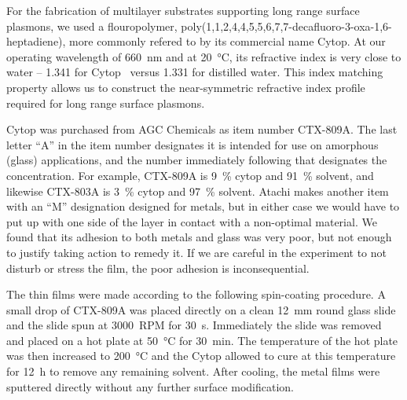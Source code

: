 For the fabrication of multilayer substrates supporting long range surface
plasmons, we used a flouropolymer,
poly(1,1,2,4,4,5,5,6,7,7-decafluoro-3-oxa-1,6-heptadiene), more commonly
refered to by its commercial name Cytop.  At our operating wavelength of
\SI{660}{\nano\meter} and at \SI{20}{\celsius}, its refractive index is
very close to water --
1.341 for Cytop~\cite{mikevs2005synthesis} versus 1.331 for distilled
water.  This index matching property allows us to construct the
near-symmetric refractive index profile required for long range surface
plasmons.

Cytop was purchased from AGC Chemicals as item number CTX-809A.  The last
letter ``A'' in the item number designates it is intended for use on
amorphous (glass) applications, and the number immediately following that
designates the concentration.  For example, CTX-809A is \SI{9}{\percent}
cytop and \SI{91}{\percent} solvent, and likewise CTX-803A is
\SI{3}{\percent} cytop and \SI{97}{\percent} solvent.  Atachi makes another
item with an ``M'' designation designed for metals, but in either case we
would have to put up with one side of the layer in contact with a
non-optimal material.  We found that its adhesion to both metals and glass
was very poor, but not enough to justify taking action to remedy it.  If we
are careful in the experiment to not disturb or stress the film, the poor
adhesion is inconsequential.

The thin films were made according to the following spin-coating procedure.
A small drop of CTX-809A was placed directly on a clean
\SI{12}{\milli\meter} round glass slide and the slide spun at
\SI{3000}{RPM} for \SI{30}{\second}.  Immediately the slide was removed and
placed on a hot plate at \SI{50}{\celsius} for \SI{30}{\minute}.  The
temperature of the hot plate was then increased to \SI{200}{\celsius} and
the Cytop allowed to cure at this temperature for \SI{12}{\hour} to remove
any remaining solvent.  After cooling, the metal films were sputtered
directly without any further surface modification.

